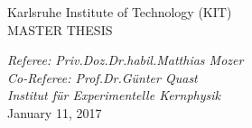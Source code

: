 \begin{titlepage}
\begin{addmargin}[0cm]{0cm}
\begin{center}
{    Karlsruhe Institute of Technology (KIT)\\
    \vspace{0.825 cm}
    \large{MASTER THESIS}\\
    \vspace{0.825 cm}


    \large{\textit{Referee: Priv.\;Doz.\;Dr.\;habil.\;Matthias Mozer}}\\
	\large{\textit{Co-Referee: Prof.\;Dr.\;G\"unter Quast}}\\
    \vspace{0.2 cm}
	\large{\textit{Institut f\"ur Experimentelle Kernphysik}}\\


	\vspace{1.0cm}
	\large{January 11, 2017}%
	}
	\end{center}
   \end{addmargin}
\end{titlepage}
